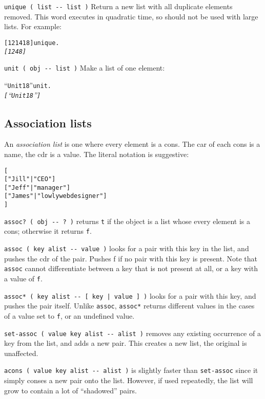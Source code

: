 \documentclass[english]{article}
\begin{document}
\texttt{unique ( list -{}- list )} Return a new list with all duplicate
elements removed. This word executes in quadratic time, so should
not be used with large lists. For example:

\begin{alltt}
{[} 1 2 1 4 1 8 {]} unique .
\emph{{[} 1 2 4 8 {]}}
\end{alltt}
\texttt{unit ( obj -{}- list )} Make a list of one element:

\begin{alltt}
{}``Unit 18'' unit .
\emph{{[} {}``Unit 18'' {]}}
\end{alltt}

\subsection{Association lists}

An \emph{association list} is one where every element is a cons. The
car of each cons is a name, the cdr is a value. The literal notation
is suggestive:

\begin{alltt}
{[}
    {[} "Jill"  | "CEO" {]}
    {[} "Jeff"  | "manager" {]}
    {[} "James" | "lowly web designer" {]}
{]}
\end{alltt}
\texttt{assoc? ( obj -{}- ? )} returns \texttt{t} if the object is
a list whose every element is a cons; otherwise it returns \texttt{f}.

\texttt{assoc ( key alist -{}- value )} looks for a pair with this
key in the list, and pushes the cdr of the pair. Pushes f if no pair
with this key is present. Note that \texttt{assoc} cannot differentiate between
a key that is not present at all, or a key with a value of \texttt{f}.

\texttt{assoc{*} ( key alist -{}- {[} key | value {]} )} looks for
a pair with this key, and pushes the pair itself. Unlike \texttt{assoc},
\texttt{assoc{*}} returns different values in the cases of a value
set to \texttt{f}, or an undefined value.

\texttt{set-assoc ( value key alist -{}- alist )} removes any existing
occurrence of a key from the list, and adds a new pair. This creates
a new list, the original is unaffected.

\texttt{acons ( value key alist -{}- alist )} is slightly faster
than \texttt{set-assoc} since it simply conses a new pair onto the
list. However, if used repeatedly, the list will grow to contain a
lot of {}``shadowed'' pairs.
\end{document}
